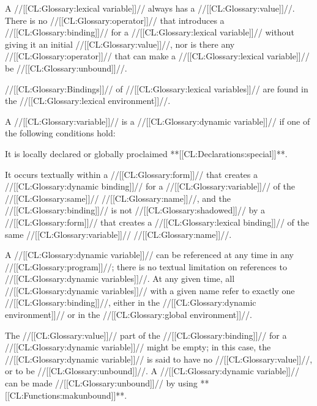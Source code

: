 A //[[CL:Glossary:lexical variable]]// always has a //[[CL:Glossary:value]]//.
There is no //[[CL:Glossary:operator]]// that introduces a //[[CL:Glossary:binding]]// for a
//[[CL:Glossary:lexical variable]]// without giving it an initial //[[CL:Glossary:value]]//, nor
is there any //[[CL:Glossary:operator]]// that can make a //[[CL:Glossary:lexical variable]]// be //[[CL:Glossary:unbound]]//.

//[[CL:Glossary:Bindings]]// of //[[CL:Glossary:lexical variables]]// are found in the //[[CL:Glossary:lexical environment]]//.

\endsubsubsubsubsection%


A //[[CL:Glossary:variable]]// is a //[[CL:Glossary:dynamic variable]]// if one of the following
conditions hold:

\beginlist

 \item{\bull} It is locally declared or globally proclaimed **[[CL:Declarations:special]]**.

 \item{\bull} It occurs textually within a //[[CL:Glossary:form]]// that
creates a //[[CL:Glossary:dynamic binding]]// for a //[[CL:Glossary:variable]]// of the //[[CL:Glossary:same]]// //[[CL:Glossary:name]]//,
and the //[[CL:Glossary:binding]]// is not //[[CL:Glossary:shadowed]]// by a //[[CL:Glossary:form]]//
that creates a //[[CL:Glossary:lexical binding]]// of the same //[[CL:Glossary:variable]]// //[[CL:Glossary:name]]//.







\endlist


A //[[CL:Glossary:dynamic variable]]// can be referenced at any time in any //[[CL:Glossary:program]]//;
there is no textual limitation on references to //[[CL:Glossary:dynamic variables]]//.
At any given time, all //[[CL:Glossary:dynamic variables]]// with a given name refer to 
exactly one //[[CL:Glossary:binding]]//, either in the //[[CL:Glossary:dynamic environment]]//
or in the //[[CL:Glossary:global environment]]//.


The //[[CL:Glossary:value]]// part of the //[[CL:Glossary:binding]]// for a //[[CL:Glossary:dynamic variable]]// might
be empty; in this case, the //[[CL:Glossary:dynamic variable]]// is said to have no //[[CL:Glossary:value]]//,
or to be //[[CL:Glossary:unbound]]//.  A //[[CL:Glossary:dynamic variable]]// can be made //[[CL:Glossary:unbound]]//
by using **[[CL:Functions:makunbound]]**.
           
